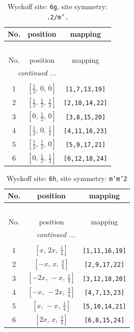 \documentclass[fleqn,8pt]{jsarticle}
\begin{document}
\renewcommand{\arraystretch}{1.2}
\begin{longtable}{ccc}
\caption{Wyckoff site: {\tt 6g}, site symmetry: {\tt .2/m'.}}
 \\
 \hline \hline
No. & position & mapping \\ \hline \endfirsthead

\multicolumn{2}{l}{\tablename\ \thetable{}} \\
 \hline \hline
No. & position & mapping \\ \hline \endhead

 \hline \hline
\multicolumn{2}{r}{\footnotesize\it continued ...} \\ \endfoot

 \hline \hline
\multicolumn{2}{r}{} \\ \endlastfoot

1 & $\left[ \frac{1}{2},\, 0,\, 0 \right]$ & {\tt [1,7,13,19]} \\ \hline
2 & $\left[ \frac{1}{2},\, \frac{1}{2},\, \frac{1}{2} \right]$ & {\tt [2,10,14,22]} \\ \hline
3 & $\left[ 0,\, \frac{1}{2},\, 0 \right]$ & {\tt [3,8,15,20]} \\ \hline
4 & $\left[ \frac{1}{2},\, 0,\, \frac{1}{2} \right]$ & {\tt [4,11,16,23]} \\ \hline
5 & $\left[ \frac{1}{2},\, \frac{1}{2},\, 0 \right]$ & {\tt [5,9,17,21]} \\ \hline
6 & $\left[ 0,\, \frac{1}{2},\, \frac{1}{2} \right]$ & {\tt [6,12,18,24]} \\
\end{longtable}
\renewcommand{\arraystretch}{1.2}
\begin{longtable}{ccc}
\caption{Wyckoff site: {\tt 6h}, site symmetry: {\tt m'm'2}}
 \\
 \hline \hline
No. & position & mapping \\ \hline \endfirsthead

\multicolumn{2}{l}{\tablename\ \thetable{}} \\
 \hline \hline
No. & position & mapping \\ \hline \endhead

 \hline \hline
\multicolumn{2}{r}{\footnotesize\it continued ...} \\ \endfoot

 \hline \hline
\multicolumn{2}{r}{} \\ \endlastfoot

1 & $\left[ x,\, 2 x,\, \frac{1}{4} \right]$ & {\tt [1,11,16,19]} \\ \hline
2 & $\left[ - x,\, x,\, \frac{3}{4} \right]$ & {\tt [2,9,17,22]} \\ \hline
3 & $\left[ - 2 x,\, - x,\, \frac{1}{4} \right]$ & {\tt [3,12,18,20]} \\ \hline
4 & $\left[ - x,\, - 2 x,\, \frac{3}{4} \right]$ & {\tt [4,7,13,23]} \\ \hline
5 & $\left[ x,\, - x,\, \frac{1}{4} \right]$ & {\tt [5,10,14,21]} \\ \hline
6 & $\left[ 2 x,\, x,\, \frac{3}{4} \right]$ & {\tt [6,8,15,24]} \\
\end{longtable}
\end{document}
